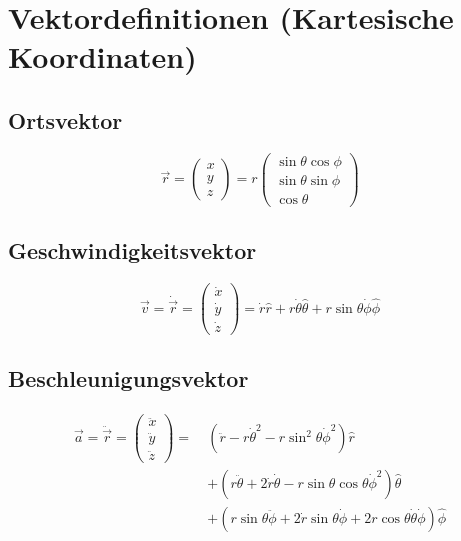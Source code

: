 \section{Vektordefinitionen (Kartesische Koordinaten)}
\subsection{Ortsvektor}
\begin{equation*}
\vec{r} = \begin{pmatrix} x \\ y \\ z \end{pmatrix} = r \begin{pmatrix} \sin\theta\cos\phi \\ \sin\theta\sin\phi \\ \cos\theta \end{pmatrix}
\end{equation*}

\subsection{Geschwindigkeitsvektor}
\begin{equation*}
\vec{v} = \dot{\vec{r}} = \begin{pmatrix} \dot{x} \\ \dot{y} \\ \dot{z} \end{pmatrix} = \dot{r}\hat{r} + r\dot{\theta}\hat{\theta} + r\sin\theta\dot{\phi}\hat{\phi}
\end{equation*}

\subsection{Beschleunigungsvektor}
{\small
\begin{align*}
\vec{a} = \ddot{\vec{r}} = \begin{pmatrix} \ddot{x} \\ \ddot{y} \\ \ddot{z} \end{pmatrix} =\ 
&\left(\ddot{r} - r\dot{\theta}^2 - r\sin^2\theta\dot{\phi}^2\right)\hat{r} \\
&+ \left(r\ddot{\theta} + 2\dot{r}\dot{\theta} - r\sin\theta\cos\theta\dot{\phi}^2\right)\hat{\theta} \\
&+ \left(r\sin\theta\ddot{\phi} + 2\dot{r}\sin\theta\dot{\phi} + 2r\cos\theta\dot{\theta}\dot{\phi}\right)\hat{\phi}
\end{align*}
}
